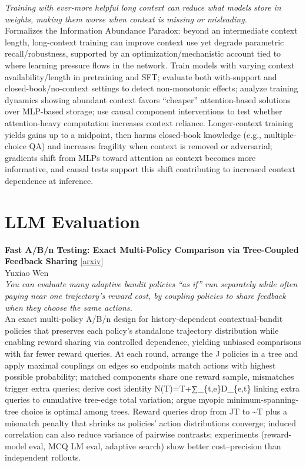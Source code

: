 \documentclass[12pt,letterpaper]{article}
\begin{document}
{\small\textit{Training with ever-more helpful long context can reduce what models store in weights, making them worse when context is missing or misleading.}}\\[1pt]
{\footnotesize Formalizes the Information Abundance Paradox: beyond an intermediate context length, long-context training can improve context use yet degrade parametric recall/robustness, supported by an optimization/mechanistic account tied to where learning pressure flows in the network. Train models with varying context availability/length in pretraining and SFT; evaluate both with-support and closed-book/no-context settings to detect non-monotonic effects; analyze training dynamics showing abundant context favors ``cheaper'' attention-based solutions over MLP-based storage; use causal component interventions to test whether attention-heavy computation increases context reliance. Longer-context training yields gains up to a midpoint, then harms closed-book knowledge (e.g., multiple-choice QA) and increases fragility when context is removed or adversarial; gradients shift from MLPs toward attention as context becomes more informative, and causal tests support this shift contributing to increased context dependence at inference.}

\medskip


\section*{LLM Evaluation}

{\small\textbf{Fast A/B/n Testing: Exact Multi-Policy Comparison via Tree-Coupled Feedback Sharing}} {\scriptsize[\href{https://arxiv.org/abs/2608.12831}{arxiv}]}\\
{\scriptsize Yuxiao Wen}\\

{\small\textit{You can evaluate many adaptive bandit policies ``as if'' run separately while often paying near one trajectory's reward cost, by coupling policies to share feedback when they choose the same actions.}}\\[1pt]
{\footnotesize An exact multi-policy A/B/n design for history-dependent contextual-bandit policies that preserves each policy's standalone trajectory distribution while enabling reward sharing via controlled dependence, yielding unbiased comparisons with far fewer reward queries. At each round, arrange the J policies in a tree and apply maximal couplings on edges so endpoints match actions with highest possible probability; matched components share one reward sample, mismatches trigger extra queries; derive cost identity N(T)=T+∑\_\{t,e\}D\_\{e,t\} linking extra queries to cumulative tree-edge total variation; argue myopic minimum-spanning-tree choice is optimal among trees. Reward queries drop from JT to \textasciitilde{}T plus a mismatch penalty that shrinks as policies' action distributions converge; induced correlation can also reduce variance of pairwise contrasts; experiments (reward-model eval, MCQ LM eval, adaptive search) show better cost--precision than independent rollouts.}
\end{document}
